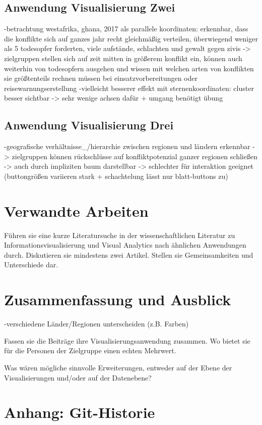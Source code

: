 \documentclass[usegeometry=true]{scrartcl}
\begin{document}
\subsection{Anwendung Visualisierung Zwei}
-betrachtung westafrika, ghana, 2017 als parallele koordinaten: erkennbar, dass die konflikte sich auf ganzes jahr recht gleichmäßig verteilen, überwiegend weniger als 5 todesopfer forderten, viele aufstände, schlachten und gewalt gegen zivis -> zielgruppen stellen sich auf zeit mitten in größerem konflikt ein, können auch weiterhin von todesopfern ausgehen und wissen mit welchen arten von konflikten sie größtenteils rechnen müssen bei einsatzvorbereitungen oder reisewarnungserstellung
-vielleicht besserer effekt mit sternenkoordinaten: cluster besser sichtbar -> sehr wenige achsen dafür + umgang benötigt übung

\subsection{Anwendung Visualisierung Drei}
-geografische verhältnisse_/hierarchie zwischen regionen und ländern erkennbar -> zielgruppen können rückschlüsse auf konfliktpotenzial ganzer regionen schließen -> auch durch impliziten baum darstellbar -> schlechter für interaktion geeignet (buttongrößen variieren stark + schachtelung lässt nur blatt-buttons zu)

\section{Verwandte Arbeiten}


Führen sie eine kurze Literatursuche in der wissenschaftlichen Literatur zu Informationsvisualisierung und Visual Analytics nach ähnlichen Anwendungen durch. Diskutieren sie mindestens zwei Artikel. Stellen sie Gemeinsamkeiten und Unterschiede dar.

\section{Zusammenfassung und Ausblick}

-verschiedene Länder/Regionen unterscheiden (z.B. Farben)

Fassen sie die Beiträge ihre Visualisierungsanwendung zusammen. Wo bietet sie für die Personen der Zielgruppe einen echten Mehrwert.

Was wären mögliche sinnvolle Erweiterungen, entweder auf der Ebene der Visualisierungen und/oder auf der Datenebene?

\section*{Anhang: Git-Historie}

\printbibliography
\end{document}
